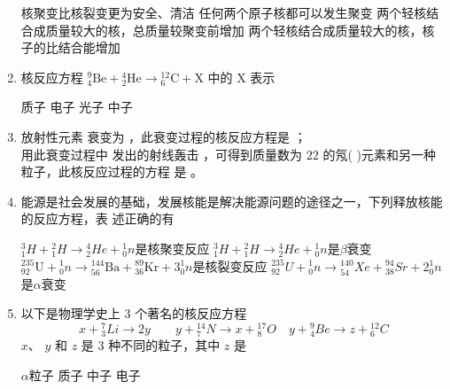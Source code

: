\begin{enumerate}
\fourchoices
{核聚变比核裂变更为安全、清洁}
{任何两个原子核都可以发生聚变}
{两个轻核结合成质量较大的核，总质量较聚变前增加}
{两个轻核结合成质量较大的核，核子的比结合能增加}



\item 
{}
核反应方程 ${ }_{4}^{9} \mathrm{Be}+{ }_{2}^{4} \mathrm{He} \rightarrow{ }_{6}^{12} \mathrm{C}+\mathrm{X}$ 中的 $ \mathrm{X} $ 表示  

\fourchoices
{质子}
{电子}
{光子}
{中子}



\item 
{}
放射性元素  衰变为  ，此衰变过程的核反应方程是
 \hfullline 
；\\
用此衰变过程中
发出的射线轰击  ，可得到质量数为 $ 22 $ 的氖(  )元素和另一种粒子，此核反应过程的方程
是 \hfullline 。


\item 
{}
能源是社会发展的基础，发展核能是解决能源问题的途径之一，下列释放核能的反应方程，表
述正确的有  


\fourchoices
{${ }_{1}^{3} H+{ }_{1}^{2} H \rightarrow{ }_{2}^{4} H e+{ }_{0}^{1} n$是核聚变反应}
{${ }_{1}^{3} H+{ }_{1}^{2} H \rightarrow{ }_{2}^{4} H e+{ }_{0}^{1} n$是$ \beta $衰变}
{${ }_{92}^{235} \mathrm{U}+{ }_{0}^{1} n \rightarrow{ }_{56}^{144} \mathrm{Ba}+{ }_{36}^{89} \mathrm{Kr}+3{ }_{0}^{1} n$是核裂变反应}
{${ }_{92}^{235} U+{ }_{0}^{1} n \rightarrow{ }_{54}^{140} X e+{ }_{38}^{94} S r+2{ }_{0}^{1} n$是$ \alpha $衰变}



\item 
{}
以下是物理学史上 $ 3 $ 个著名的核反应方程
\[ x+{ }_{3}^{7} L i \rightarrow 2 y \quad \quad y+{ }_{7}^{14} N \rightarrow x+{ }_{8}^{17} O \quad y+{ }_{4}^{9} B e \rightarrow z+{ }_{6}^{12} C \]
$ x $、 $ y $ 和 $ z $ 是 $ 3 $ 种不同的粒子，其中 $ z $ 是  

\fourchoices
{$ \alpha $粒子}
{质子}
{中子}
{电子}






\end{enumerate}
